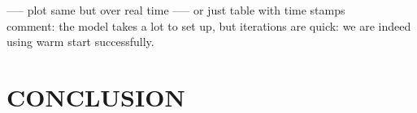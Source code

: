 {----- plot same but over real time ----- or just table with time stamps\\
comment: the model takes a lot to set up, but iterations are quick: we are indeed using warm start successfully.

}















\section{CONCLUSION}

















